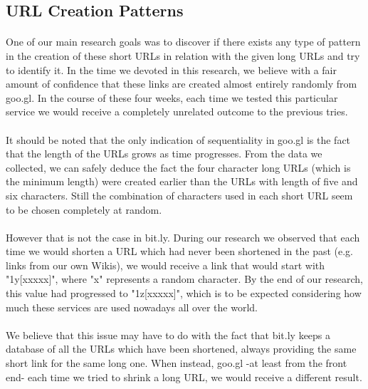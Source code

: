 \documentclass[12pt]{article}
\begin{document}
\subsection{URL Creation Patterns}

\paragraph{}
 One of our main research goals was to discover if there exists any type of pattern in the creation of these short URLs in relation with the given long URLs and try to identify it. In the time we devoted in this research, we believe with a fair amount of confidence that these links are created almost entirely randomly from goo.gl. In the course of these four weeks, each time we tested this particular service we would receive a completely unrelated outcome to the previous tries.
 
\paragraph{}
 It should be noted that the only indication of sequentiality in goo.gl is the fact that the length of the URLs grows as time progresses. From the data we collected, we can safely deduce the fact the four character long URLs (which is the minimum length) were created earlier than the URLs with length of five and six characters. Still the combination of characters used in each short URL seem to be chosen completely at random. 
 
\paragraph{}
 However that is not the case in bit.ly. During our research we observed that each time we would shorten a URL which had never been shortened in the past (e.g. links from our own Wikis), we would receive a link that would start with "1y[xxxxx]", where "x" represents a random character. By the end of our research, this value had progressed to "1z[xxxxx]", which is to be expected considering how much these services are used nowadays all over the world.
 
\paragraph{}
 We believe that this issue may have to do with the fact that bit.ly keeps a database of all the URLs which have been shortened, always providing the same short link for the same long one. When instead, goo.gl -at least from the front end- each time we tried to shrink a long URL, we would receive a different result.
\end{document}
